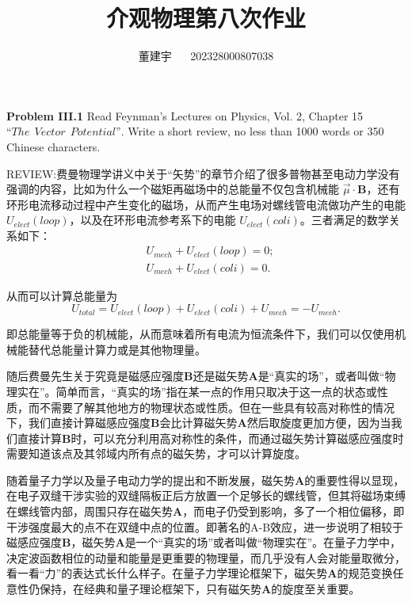 \documentclass[reqno,a4paper,12pt]{amsart}
\title{介观物理第八次作业}
\author{董建宇 ~~ 202328000807038}
\begin{document}
\maketitle
\titleformat{\section}[hang]{\small}{\thesection}{0.8em}{}{}
\titleformat{\subsection}[hang]{\small}{\thesubsection}{0.8em}{}{}

\textbf{Problem III.1} Read Feynman’s Lectures on Physics, Vol. 2, Chapter 15 $“The \ \ Vector \ \ Potential”$. Write a short review, no less than 1000 words or 350 Chinese characters.

\textsc{REVIEW:}费曼物理学讲义中关于“矢势”的章节介绍了很多普物甚至电动力学没有强调的内容，比如为什么一个磁矩再磁场中的总能量不仅包含机械能 $\vec{\mu} \cdot \mathbf{B}$，还有环形电流移动过程中产生变化的磁场，从而产生电场对螺线管电流做功产生的电能 $U_{elect}(loop)$，以及在环形电流参考系下的电能 $U_{elect}(coli)$。三者满足的数学关系如下：
\begin{align*}
	&U_{mech} + U_{elect}(loop) = 0; \\
	&U_{mech} + U_{elect}(coli) = 0.
\end{align*}

从而可以计算总能量为
\[
	U_{total} = U_{elect}(loop) + U_{elect}(coli) + U_{mech} = -U_{mech}.
\]

即总能量等于负的机械能，从而意味着所有电流为恒流条件下，我们可以仅使用机械能替代总能量计算力或是其他物理量。

随后费曼先生关于究竟是磁感应强度$\mathbf{B}$还是磁矢势$\mathbf{A}$是“真实的场”，或者叫做“物理实在”。简单而言，“真实的场”指在某一点的作用只取决于这一点的状态或性质，而不需要了解其他地方的物理状态或性质。但在一些具有较高对称性的情况下，我们直接计算磁感应强度$\mathbf{B}$会比计算磁矢势$\mathbf{A}$然后取旋度更加方便，因为当我们直接计算$\mathbf{B}$时，可以充分利用高对称性的条件，而通过磁矢势计算磁感应强度时需要知道该点及其邻域内所有点的磁矢势，才可以计算旋度。

随着量子力学以及量子电动力学的提出和不断发展，磁矢势$\mathbf{A}$的重要性得以显现，在电子双缝干涉实验的双缝隔板正后方放置一个足够长的螺线管，但其将磁场束缚在螺线管内部，周围只存在磁矢势$\mathbf{A}$，而电子仍受到影响，多了一个相位偏移，即干涉强度最大的点不在双缝中点的位置。即著名的A-B效应，进一步说明了相较于磁感应强度$\mathbf{B}$，磁矢势$\mathbf{A}$是一个“真实的场”或者叫做“物理实在”。在量子力学中，决定波函数相位的动量和能量是更重要的物理量，而几乎没有人会对能量取微分，看一看“力”的表达式长什么样子。在量子力学理论框架下，磁矢势$\mathbf{A}$的规范变换任意性仍保持，在经典和量子理论框架下，只有磁矢势$\mathbf{A}$的旋度至关重要。
\end{document}
